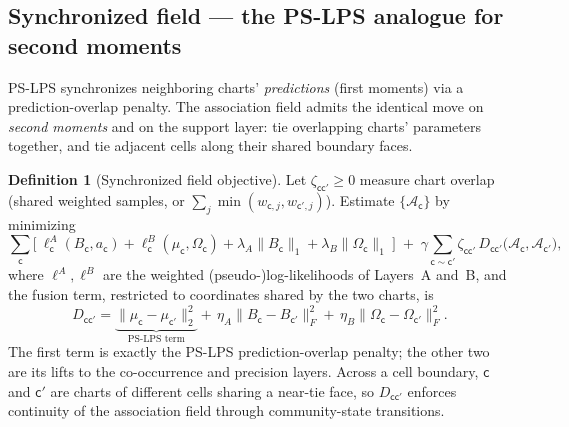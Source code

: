 \documentclass[11pt]{article}
\theoremstyle{definition}
\newtheorem{definition}{Definition}[section]
\theoremstyle{plain}
\theoremstyle{remark}
\newcommand{\1}{\mathbf{1}}
\newcommand{\Prec}{\Omega}
\newcommand{\Edge}{B}
\newcommand{\Field}{\mathcal{A}}
\newcommand{\cc}{\mathsf{c}}              %
\newcommand{\norm}[1]{\lVert #1 \rVert}
\begin{document}
\subsection{Synchronized field --- the PS-LPS analogue for second moments}
\label{sec:sync}
PS-LPS synchronizes neighboring charts' \emph{predictions} (first moments) via a
prediction-overlap penalty. The association field admits the identical move on
\emph{second moments} and on the support layer: tie overlapping charts'
parameters together, and tie adjacent cells along their shared boundary faces.

\begin{definition}[Synchronized field objective]\label{def:sync}
Let $\zeta_{\cc\cc'}\ge0$ measure chart overlap (shared weighted samples, or
$\sum_j \min(w_{\cc,j},w_{\cc',j})$). Estimate $\{\Field_\cc\}$ by minimizing
\[
  \sum_{\cc}\Big[\ \ell^{A}_\cc(\Edge_\cc,a_\cc)
     +\ell^{B}_\cc(\mu_\cc,\Prec_\cc)
     +\lambda_A\norm{\Edge_\cc}_1+\lambda_B\norm{\Prec_\cc}_1\ \Big]
  \;+\;\gamma\!\!\sum_{\cc\sim\cc'}\!\!\zeta_{\cc\cc'}\,
     D_{\cc\cc'}\big(\Field_\cc,\Field_{\cc'}\big),
\]
where $\ell^A,\ell^B$ are the weighted (pseudo-)log-likelihoods of
Layers~A and~B, and the fusion term, restricted to coordinates shared by the two
charts, is
\[
  D_{\cc\cc'}=\underbrace{\norm{\mu_\cc-\mu_{\cc'}}_2^2}_{\text{PS-LPS term}}
  +\,\eta_A\norm{\Edge_\cc-\Edge_{\cc'}}_F^2
  +\,\eta_B\norm{\Prec_\cc-\Prec_{\cc'}}_F^2 .
\]
The first term is exactly the PS-LPS prediction-overlap penalty; the other two
are its lifts to the co-occurrence and precision layers. Across a cell boundary,
$\cc$ and $\cc'$ are charts of different cells sharing a near-tie face, so
$D_{\cc\cc'}$ enforces continuity of the association field through community-state
transitions.
\end{definition}
\end{document}
